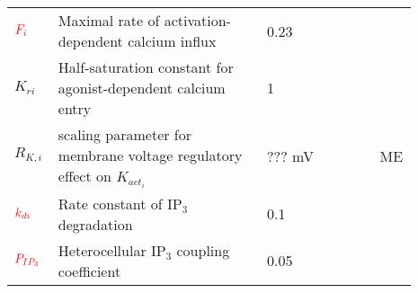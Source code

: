 \documentclass[fleqn]{report}
\numberwithin{equation}{section}
\numberwithin{equation}{section}
\begin{document}
 		\begin{table}[h!]
 		\centering
 		\begin{tabular}{ p{0.09\linewidth}  >{\footnotesize} p{0.5\linewidth}  >{\footnotesize} p{0.27\linewidth} >{\footnotesize} p{0.03\linewidth} }
 		\hline
 		 $\textcolor{red}{F_{i}}$      			& Maximal rate of activation-dependent calcium influx			& 0.23 \uMps				& \cite{Koenigsberger2006} \\
 		$K_{ri}$				& Half-saturation constant for agonist-dependent calcium entry	& 1 \uM					& \cite{Koenigsberger2006} \\
 		$R_{K,i}$				& scaling parameter for membrane voltage regulatory effect on $K_{act_{i}}$	& ???   mV					&   ME \\
 		$\textcolor{red}{k_{di}}$      			& Rate constant of IP$_{3}$ degradation	& 0.1 \pers	&\cite{Koenigsberger2006} \\
 		 		$\textcolor{red}{P_{IP_{3}}}$      		& Heterocellular IP$_{3}$ coupling coefficient	& 0.05 \pers	&  \cite{Koenigsberger2006} \\
 		\hline
 		\end{tabular}
 		\label{tab:IP3i}
 		\end{table}
 		
\end{document}
